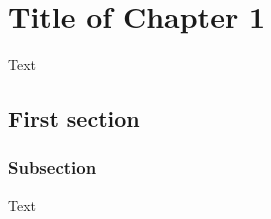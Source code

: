 \chapter{Title of Chapter 1}
\label{cha:label}
Text
\section{First section}
\subsection{Subsection}
\label{sec:section1}
Text

